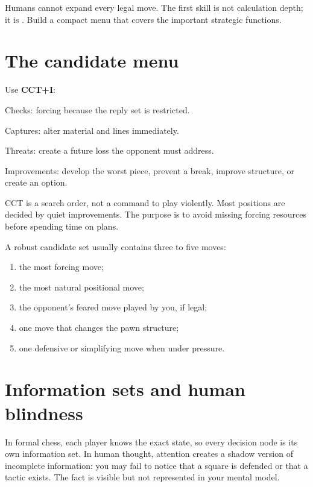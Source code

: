 Humans cannot expand every legal move. The first skill is not calculation depth; it is . Build a compact menu that covers the important strategic functions.

\section{The candidate menu}
Use \textbf{CCT+I}:

\begin{description}[style=multiline,leftmargin=2.4em,labelwidth=1.9em]
\item[C] Checks: forcing because the reply set is restricted.
\item[C] Captures: alter material and lines immediately.
\item[T] Threats: create a future loss the opponent must address.
\item[I] Improvements: develop the worst piece, prevent a break, improve structure, or create an option.
\end{description}

CCT is a search order, not a command to play violently. Most positions are decided by quiet improvements. The purpose is to avoid missing forcing resources before spending time on plans.

A robust candidate set usually contains three to five moves:

\begin{enumerate}[label=\arabic*.,leftmargin=1.4em]
\item the most forcing move;
\item the most natural positional move;
\item the opponent's feared move played by you, if legal;
\item one move that changes the pawn structure;
\item one defensive or simplifying move when under pressure.
\end{enumerate}

\section{Information sets and human blindness}
In formal chess, each player knows the exact state, so every decision node is its own information set. In human thought, attention creates a shadow version of incomplete information: you may fail to notice that a square is defended or that a tactic exists. The fact is visible but not represented in your mental model.

